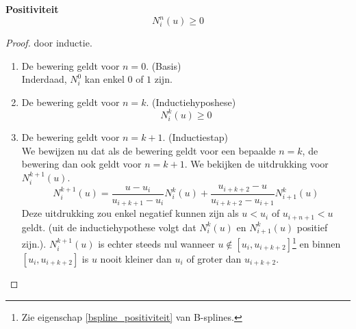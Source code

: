 \documentclass[computergesteund_ontwerp_van_curven_en_oppervlakken.tex]{subfiles}
\begin{document}
\begin{ei}\textbf{Positiviteit}
\label{bspline_positiviteit}
\[
N_{i}^{n}(u) \ge 0
\]
\begin{proof} door inductie.\\
\begin{enumerate}
\item De bewering geldt voor $n=0$. (Basis)\\
Inderdaad, $N_{i}^{0}$ kan enkel $0$ of $1$ zijn.
\item De bewering geldt voor $n=k$. (Inductiehyposhese)
\[
N_{i}^{k}(u) \ge 0
\]
\item De bewering geldt voor $n=k+1$. (Inductiestap)\\
We bewijzen nu dat als de bewering geldt voor een bepaalde $n=k$, de bewering dan ook geldt voor $n=k+1$.
We bekijken de uitdrukking voor $N_{i}^{k+1}(u)$.
\[
N_{i}^{k+1}(u)
= \frac{u-u_i}{u_{i+k+1}-u_i}					N_{i}^{k}(u)
+ \frac{u_{i+k+2}-u}{u_{i+k+2}-u_{i+1}}			N_{i+1}^{k}(u)
\]
Deze uitdrukking zou enkel negatief kunnen zijn als $u < u_i$ of $u_{i+n+1} < u$ geldt. (uit de inductiehypothese volgt dat $N_{i}^{k}(u)$ en $N_{i+1}^{k}(u)$ positief zijn.).
$N_{i}^{k+1}(u)$ is echter steeds nul wanneer $u \not\in [u_i,u_{i+k+2}]$\footnote{Zie eigenschap \ref{bspline_positiviteit} van B-splines.} en binnen $[u_i,u_{i+k+2}]$ is $u$ nooit kleiner dan $u_i$ of groter dan $u_{i+k+2}$.
\end{enumerate}
\end{proof}
\end{ei}
\end{document}
